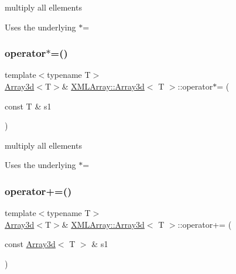 multiply all ellements 

Uses the underlying $\ast$= \mbox{\label{classXMLArray_1_1Array3d_aff3679dabbd2691243dce85defb9519d}} 
\subsubsection{\texorpdfstring{operator$\ast$=()}{operator*=()}\hspace{0.1cm}{\footnotesize\ttfamily [4/4]}}
{\footnotesize\ttfamily template$<$typename T$>$ \\
\mbox{\hyperlink{classXMLArray_1_1Array3d}{Array3d}}$<$T$>$\& \mbox{\hyperlink{classXMLArray_1_1Array3d}{X\+M\+L\+Array\+::\+Array3d}}$<$ T $>$\+::operator$\ast$= (\begin{DoxyParamCaption}\item[{const T \&}]{s1 }\end{DoxyParamCaption})\hspace{0.3cm}{\ttfamily [inline]}}



multiply all ellements 

Uses the underlying $\ast$= \mbox{\label{classXMLArray_1_1Array3d_add116e7a7b9da853f2b463d5fb3a9b1e}} 
\subsubsection{\texorpdfstring{operator+=()}{operator+=()}\hspace{0.1cm}{\footnotesize\ttfamily [1/2]}}
{\footnotesize\ttfamily template$<$typename T$>$ \\
\mbox{\hyperlink{classXMLArray_1_1Array3d}{Array3d}}$<$T$>$\& \mbox{\hyperlink{classXMLArray_1_1Array3d}{X\+M\+L\+Array\+::\+Array3d}}$<$ T $>$\+::operator+= (\begin{DoxyParamCaption}\item[{const \mbox{\hyperlink{classXMLArray_1_1Array3d}{Array3d}}$<$ T $>$ \&}]{s1 }\end{DoxyParamCaption})\hspace{0.3cm}{\ttfamily [inline]}}



